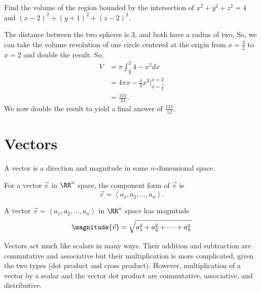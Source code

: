 \begin{example}
    Find the volume of the region bounded by the intersection of $x^{2} + y^{2} + z^{2} = 4$ and $(x - 2)^{2} + (y + 1)^{2} + (z - 2)^{2}$.

    \begin{soln}
        The distance between the two spheres is 3, and both have a radius of two. So, we can take the volume revolution of one circle centered at the origin from $x = \frac{3}{2}$ to $x = 2$ and double the result. So,
        \begin{align*}
            V &= \pi\int_{\frac{3}{2}}^{2} 4 - x^{2}dx \\
            &= 4\pi x - \frac{\pi}{3}x^{3} \biggr\rvert_{x = \frac{3}{2}}^{x = 2} \\
            &= \frac{11\pi}{24}.
        \end{align*}
        We now double the result to yield a final answer of $\frac{11\pi}{12}$.
    \end{soln}
\end{example}

\section{Vectors}

\begin{definition}[Vector]
    A vector is a direction and magnitude in some $n$-dimensional space.
\end{definition}

\begin{definition}
    For a vector $\vec{v}$ in $\RR^{n}$ space, the component form of $\vec{v}$ is
    \[\vec{v} = \left<a_{1}, a_{2}, \dots, a_{n}\right>.\]
\end{definition}

\begin{definition}
    A vector $\vec{v} = \left<a_{1}, a_{2}, \dots, a_{n}\right>$ in $\RR^{n}$ space has magnitude
    \[\magnitude{\vec{v}} = \sqrt{a_{1}^{2} + a_{2}^{2} + \cdots + a_{n}^{2}}\]
\end{definition}

\begin{remark}
    Vectors act much like scalars in many ways. Their addition and subtraction are commutative and associative but their multiplication is more complicated, given the two types (dot product and cross product). However, multiplication of a vector by a scalar and the vector dot product are commutative, associative, and distributive.
\end{remark}

